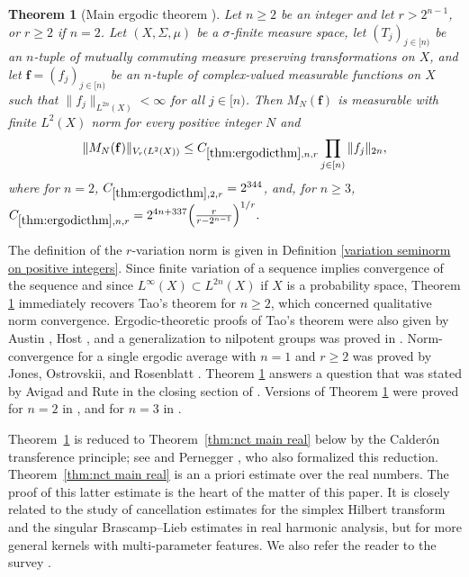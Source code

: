 \documentclass[12pt,reqno]{amsart}
\theoremstyle{plain}
\newtheorem{theorem}{Theorem}[section]
\numberwithin{equation}{section}
\theoremstyle{remark}
\newcommand{\uses}[1]{}
\newcommand{\usesdefs}[1]{}
\newcommand{\leanok}{}
\newcommand{\lean}[1]{}
\DeclareRobustCommand{\leanlink}[1]{%
    \href
    {https://pjroos.com/lean-nct/docs/find/?pattern=#1\&strict=false\#doc}
    {\ensuremath{\forall}}
}
\begin{document}
\begin{theorem}[Main ergodic theorem \leanlink{nCT.main_ergodic_theorem}]\label{thm:ergodicthm}\lean{nCT.main_ergodic_theorem}\leanok\uses{thm:ergodicthmJ,jump estimates imply variation}\usesdefs{ergodic averages}
Let $n\ge 2$ be an integer and let $r>2^{n-1}$, or $r\ge 2$ if $n=2$. 
Let $(X,\Sigma,\mu)$ be a $\sigma$-finite measure space, 
let $(T_j)_{j\in [n)}$ be an $n$-tuple of mutually commuting measure 
preserving transformations on $X$, 
and let $\mathbf{f}=(f_j)_{j\in [n)}$ be an $n$-tuple 
of complex-valued measurable functions on $X$
such that $\|f_j\|_{L^{2n}(X)}<\infty$ for all $j\in[n)$. 
Then $M_N(\mathbf{f})$ is measurable with 
finite $L^2(X)$ norm for every
positive integer $N$ and
\begin{equation}\label{main ergodic variation estimate}
 \| M_{N} (\mathbf{f}) \|_{V_{r}(L^2(X))}
\le C_{\ref{thm:ergodicthm},n,r}
 \prod_{j\in [n)} \|f_j\|_{2n},
\end{equation}
where for $n=2$,
$C_{\ref{thm:ergodicthm},2,r}=2^{344}$,
and, for $n\ge3$,
$C_{\ref{thm:ergodicthm},n,r}
=
2^{4n+337}
\Big(\frac{r}{r-2^{n-1}}\Big)^{1/r}.$
\end{theorem}
  The definition of the $r$-variation norm is given in Definition \ref{variation seminorm on positive integers}.
Since finite variation of a sequence implies convergence of the sequence and since $L^\infty(X)\subset L^{2n}(X)$ if $X$ is a probability space, Theorem \ref{thm:ergodicthm} immediately recovers Tao's theorem  \cite[Theorem 1.1]{Tao07} for $n\ge 2$, which concerned qualitative norm convergence. Ergodic-theoretic proofs of Tao's theorem were also given by Austin \cite{Austin10}, Host \cite{Host09}, and a generalization to nilpotent groups was proved in \cite{Walsh12}.
Norm-convergence for a single ergodic average with $n=1$ and  $r\ge 2$ was proved by Jones, Ostrovskii, and Rosenblatt \cite{JonesOstrovskiiRosenblatt96}. 
Theorem \ref{thm:ergodicthm} answers a question that was stated by Avigad and Rute in the closing section of \cite{AvigadRute15}. 
Versions of Theorem \ref{thm:ergodicthm} were proved for $n=2$ in \cite{DurcikKovacSkrebThiele19,Kovac16}, and for $n=3$ in \cite{DurcikSlavikovaThiele26}.

Theorem~\ref{thm:ergodicthm} is  reduced  to Theorem~\ref{thm:nct main real} below  by the Calder\'on transference principle; see  \cite{DurcikKovacSkrebThiele19} and  Pernegger \cite{Pernegger2025}, who also formalized this reduction.  Theorem~\ref{thm:nct main real} is an a priori estimate over the real numbers. The proof of this latter estimate is the heart of the matter of this paper. 
It is closely related to the study of cancellation estimates for the simplex Hilbert transform \cite{DurcikKovacThiele19}  and  the singular Brascamp--Lieb estimates  \cite{Kovac12,DurcikSlavikovaThiele22} in real harmonic analysis, but for more general kernels with multi-parameter features. We also refer the reader to   the survey \cite{DurcikThiele21survey}. 
\end{document}
